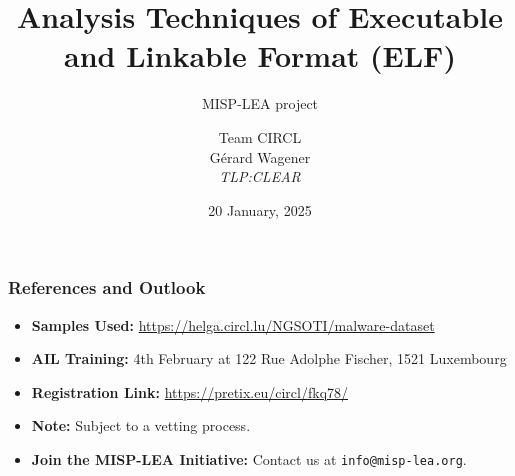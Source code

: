 \documentclass{beamer}
\author{\small{Team CIRCL\\G{\'e}rard Wagener \\ \emph{TLP:CLEAR}}}
\title{Analysis Techniques of Executable and Linkable Format (ELF)}
\subtitle{MISP-LEA project}
\institute{\href{https://www.circl.lu}{https://www.circl.lu} \\}
\date{20 January, 2025}
\begin{document}
\begin{frame}
    \maketitle
\end{frame}







%

\begin{frame}
    \frametitle{References and Outlook}
    \begin{itemize}
        \item \textbf{Samples Used:}
        \url{https://helga.circl.lu/NGSOTI/malware-dataset}
        \item \textbf{AIL Training:}
        4th February at 122 Rue Adolphe Fischer, 1521 Luxembourg
        \item \textbf{Registration Link:}
        \url{https://pretix.eu/circl/fkq78/}
        \item \textbf{Note:} Subject to a vetting process.
        \item \textbf{Join the MISP-LEA Initiative:}
        Contact us at \texttt{info@misp-lea.org}.
    \end{itemize}
\end{frame}
\end{document}
